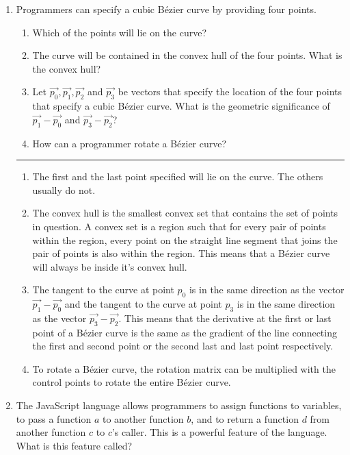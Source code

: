 \documentclass[oneside]{article}
\newenvironment{answer}
  {\vspace*{0.2cm} \rule{12cm}{0.02cm} \vspace*{0.2cm}}
  {\vspace*{0.2cm}}
\begin{document}
\begin{enumerate}
  \item Programmers can specify a cubic B\'{e}zier curve by
    providing four points.
  \begin{enumerate}
    \item Which of the points will lie on the curve?
    \item The curve will be contained in the convex hull
      of the four points. What is the convex hull?
    \item Let $\vec{p_0}, \vec{p_1}, \vec{p_2}$ and $\vec{p_3}$
      be vectors that specify the location
      of the four points that specify a cubic B\'{e}zier curve.
      What is the geometric significance of $\vec{p_1} - \vec{p_0}$
      and $\vec{p_3} - \vec{p_2}$?
    \item How can a programmer rotate a B\'{e}zier curve?
    \end{enumerate}

  \begin{answer}

  \begin{enumerate}
    \item The first and the last point specified will lie on the curve. The others usually do not.
    \item The convex hull is the smallest convex set that contains the set of points in question.
    A convex set is a region such that for every pair of points within the region, every point on
    the straight line segment that joins the pair of points is also within the region.
    This means that a B\'{e}zier curve will always be inside it's convex hull.
    \item The tangent to the curve at point $p_0$ is in the same direction as the vector $\vec{p_1} - \vec{p_0}$ and
    the tangent to the curve at point $p_3$ is in the same direction as the vector $\vec{p_3} - \vec{p_2}$. This means that
    the derivative at the first or last point of a B\'{e}zier curve is the same as the gradient of the line connecting the first and
    second point or the second last and last point respectively.
    \item To rotate a B\'{e}zier curve, the rotation matrix can be multiplied with the control points to rotate the entire B\'{e}zier curve.
    \end{enumerate}

    \end{answer}

  \item The JavaScript language allows programmers to assign
    functions to variables, to pass a function $a$ to another function $b$,
    and to return a function $d$ from another function $c$ to $c$'s caller.
    This is a powerful feature of the language. What is this feature called?


\end{enumerate}
\end{document}
